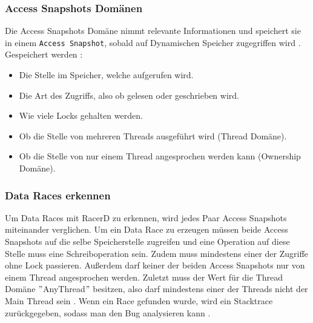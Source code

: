 \subsubsection*{Access Snapshots Domänen}

Die Access Snapshots Domäne nimmt relevante Informationen und speichert sie in einem \texttt{Access Snapshot}, sobald auf Dynamischen Speicher zugegriffen wird \cite[vlg.][11]{racerd}. Gespeichert werden \cite[vgl.][8]{racerd}:
\begin{itemize}
	\item Die Stelle im Speicher, welche aufgerufen wird.
	\item Die Art des Zugriffs, also ob gelesen oder geschrieben wird.
	\item Wie viele Locks gehalten werden.
	\item Ob die Stelle von mehreren Threads ausgeführt wird (Thread Domäne).
	\item Ob die Stelle von nur einem Thread angesprochen werden kann (Ownership Domäne).
\end{itemize}

\subsubsection*{Data Races erkennen}

Um Data Races mit RacerD zu erkennen, wird jedes Paar Access Snapshots miteinander verglichen. Um ein Data Race zu erzeugen müssen beide Access Snapshots auf die selbe Speicherstelle zugreifen und eine Operation auf diese Stelle muss eine Schreiboperation sein. Zudem muss mindestens einer der Zugriffe ohne Lock passieren. Außerdem darf keiner der beiden Access Snapshots nur von einem Thread angesprochen werden. Zuletzt muss der Wert für die Thread Domäne $"$AnyThread$"$ besitzen, also darf mindestens einer der Threads nicht der Main Thread sein \cite[vgl.][8]{racerd}. Wenn ein Race gefunden wurde, wird ein Stacktrace zurückgegeben, sodass man den Bug analysieren kann \cite[vgl.][15]{racerd}.


